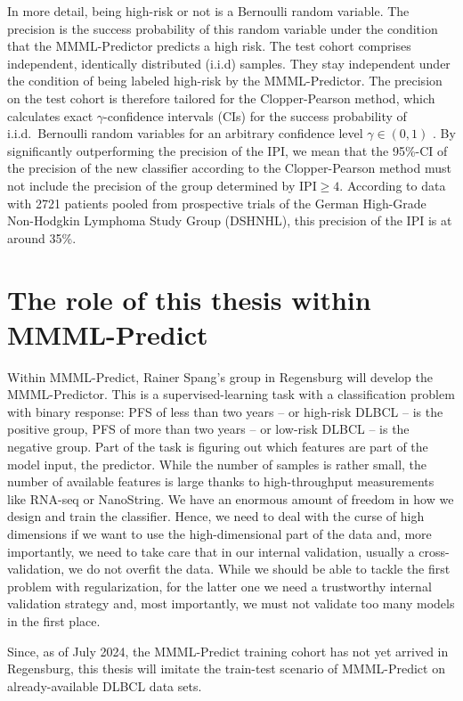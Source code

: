In more detail, being high-risk or not is a Bernoulli random variable. 
The precision is the success probability of this random variable under the condition that the 
MMML-Predictor predicts a high risk. The test cohort comprises independent, identically distributed 
(i.i.d) samples. They stay independent under the condition of being labeled high-risk by the 
MMML-Predictor. The precision on the test cohort is therefore tailored for the Clopper-Pearson 
method, which calculates exact $\gamma$-confidence intervals (CIs) for the success probability 
of i.i.d.\ Bernoulli random variables for an arbitrary confidence level $\gamma \in (0, 1)$
\cite{clopper34}.
By significantly outperforming the precision of the IPI, we mean that the \num{95}\%-CI
of the precision of the new classifier according to the Clopper-Pearson method must not include the 
precision of the group determined by $\text{IPI} \geq 4$. According to data with \num{2721} 
patients pooled from prospective trials of the German High-Grade Non-Hodgkin Lymphoma Study Group 
(DSHNHL), this precision of the IPI is at around \num{35}\%. 

\section{The role of this thesis within MMML-Predict}

Within MMML-Predict, Rainer Spang's group in Regensburg will develop the MMML-Predictor. 
This is 
a supervised-learning task with a classification problem with binary response: PFS of less 
than two years -- or high-risk DLBCL -- is the positive group, PFS of more than two 
years -- or low-risk DLBCL -- is the negative group. Part of the task is figuring out which features
are part of the model input, the predictor.
While the number of samples is rather small, 
the number of available features is large thanks to high-throughput measurements like RNA-seq or 
NanoString. We have an enormous amount of freedom in how we design and train the classifier. 
Hence, we need to deal with the curse of high dimensions if we want to use the high-dimensional part 
of the data and, 
more importantly, we need to take care that in our internal validation, usually a cross-validation,
we do not overfit the data. While we should be able to tackle the first problem with regularization,
for the latter one we need a trustworthy internal validation strategy and, most importantly, we 
must not validate too many models in the first place.

Since, as of July 2024, the MMML-Predict training cohort has not yet arrived in Regensburg, this thesis
will imitate the train-test scenario of MMML-Predict on already-available DLBCL data sets. 


